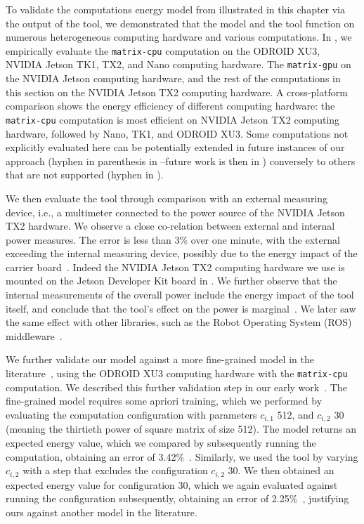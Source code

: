 To validate the computations energy model from  illustrated in this chapter via the output of the \powprof{} tool, we demonstrated that the model and the tool function on numerous heterogeneous computing hardware and various computations. In , we empirically evaluate the {\small\tt matrix-cpu} computation on the ODROID XU3, NVIDIA Jetson TK1, TX2, and Nano computing hardware. The {\small\tt matrix-gpu} on the NVIDIA Jetson computing hardware, and the rest of the computations in this section on the NVIDIA Jetson TX2 computing hardware. A cross-platform comparison shows the energy efficiency of different computing hardware: the {\small\tt matrix-cpu} computation is most efficient on NVIDIA Jetson TX2 computing hardware, followed by Nano, TK1, and ODROID XU3. Some computations not explicitly evaluated here can be potentially extended in future instances of our approach (hyphen in parenthesis in --future work is then in ) conversely to others that are not supported (hyphen in ). 

We then evaluate the \powprof{} tool through comparison with an external measuring device, i.e., a multimeter connected to the power source of the NVIDIA Jetson TX2 hardware. We observe a close co-relation between external and internal power measures. The error is less than 3\% over one minute, with the external exceeding the internal measuring device, possibly due to the energy impact of the carrier board~\citep{seewald2019coarse}. Indeed the NVIDIA Jetson TX2 computing hardware we use is mounted on the Jetson Developer Kit board in . We further observe that the internal measurements of the overall power include the energy impact of the tool itself, and conclude that the tool's effect on the power is marginal~\citep{seewald2019coarse}. We later saw the same effect with other libraries, such as the Robot Operating System (ROS) middleware~\citep{zamanakos2020energy}.

We further validate our model against a more fine-grained model in the literature~\cite{nunez2013enabling,nikov2015evaluation}, using the ODROID XU3 computing hardware with the {\small\tt matrix-cpu} computation. We described this further validation step in our early work~\citep{seewald2019coarse}. The fine-grained model requires some apriori training, which we performed by evaluating the computation configuration with parameters $c_{i,1}$ 512, and $c_{i,2}$ 30 (meaning the thirtieth power of square matrix of size 512). The model returns an expected energy value, which we compared by subsequently running the computation, obtaining an error of 3.42\%~\citep{seewald2019coarse}. Similarly, we used the \powprof{} tool by varying $c_{i,2}$ with a step that excludes the configuration $c_{i,2}$ 30. We then obtained an expected energy value for configuration 30, which we again evaluated against running the configuration subsequently, obtaining an error of 2.25\%~\citep{seewald2019coarse}, justifying ours against another model in the literature. 



